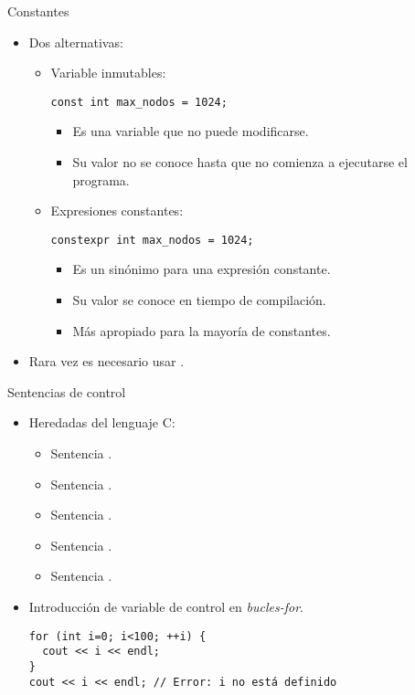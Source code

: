 \begin{frame}[fragile]{Constantes}
\begin{itemize}
\item Dos alternativas:
  \begin{itemize}
    \item Variable inmutables:
\begin{lstlisting}
const int max_nodos = 1024;
\end{lstlisting}
      \begin{itemize}
        \item Es una variable que no puede modificarse.
        \item Su valor no se conoce hasta que no comienza a ejecutarse el programa.
      \end{itemize}
    \item Expresiones constantes:
\begin{lstlisting}
constexpr int max_nodos = 1024;
\end{lstlisting}
      \begin{itemize}
        \item Es un sinónimo para una expresión constante.
        \item Su valor se conoce en tiempo de compilación.
        \item Más apropiado para la mayoría de constantes.
      \end{itemize}
  \end{itemize}
\item Rara vez es necesario usar .
\end{itemize}
\end{frame}

\begin{frame}[t,fragile]{Sentencias de control}
\begin{itemize}
  \item Heredadas del lenguaje C:
    \begin{itemize}
      \item Sentencia .
      \item Sentencia .
      \item Sentencia .
      \item Sentencia .
      \item Sentencia .
    \end{itemize}
  \item Introducción de variable de control en \emph{bucles-for}.
\begin{lstlisting}
for (int i=0; i<100; ++i) {
  cout << i << endl;
}
cout << i << endl; // Error: i no está definido
\end{lstlisting}
\end{itemize}
\end{frame}


